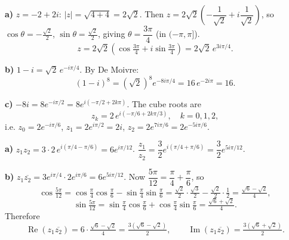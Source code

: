 \documentclass[11pt]{article}
\begin{document}
\begin{corrige}
\textbf{a)} $z = -2 + 2i$: $|z| = \sqrt{4+4} = 2\sqrt{2}$. Then $z = 2\sqrt{2}\left(-\dfrac{1}{\sqrt{2}} + i\dfrac{1}{\sqrt{2}}\right)$, so $\cos\theta = -\frac{\sqrt2}{2}$, $\sin\theta = \frac{\sqrt2}{2}$, giving $\theta = \dfrac{3\pi}{4}$ (in $(-\pi,\pi]$).
\[ z = 2\sqrt{2}\left(\cos\tfrac{3\pi}{4} + i\sin\tfrac{3\pi}{4}\right) = 2\sqrt{2}\,e^{3i\pi/4}. \]

\textbf{b)} $1 - i = \sqrt{2}\,e^{-i\pi/4}$. By De Moivre:
\[ (1-i)^8 = (\sqrt{2})^8 e^{-8i\pi/4} = 16\,e^{-2i\pi} = 16. \]

\textbf{c)} $-8i = 8e^{-i\pi/2} = 8e^{i( -\pi/2 + 2k\pi)}$. The cube roots are
\[ z_k = 2\,e^{i(-\pi/6 + 2k\pi/3)}, \quad k = 0, 1, 2, \]
i.e. $z_0 = 2e^{-i\pi/6}$, $z_1 = 2e^{i\pi/2} = 2i$, $z_2 = 2e^{7i\pi/6} = 2e^{-5i\pi/6}$.
\end{corrige}

\begin{corrige}
\textbf{a)} $z_1 z_2 = 3 \cdot 2 \, e^{i(\pi/4 - \pi/6)} = 6e^{i\pi/12}$. \quad $\dfrac{z_1}{z_2} = \dfrac{3}{2}e^{i(\pi/4 + \pi/6)} = \dfrac{3}{2}e^{5i\pi/12}$.

\textbf{b)} $z_1\overline{z_2} = 3e^{i\pi/4}\cdot 2e^{i\pi/6} = 6e^{5i\pi/12}$. Now $\dfrac{5\pi}{12} = \dfrac{\pi}{4} + \dfrac{\pi}{6}$, so
\[ \cos\tfrac{5\pi}{12} = \cos\tfrac{\pi}{4}\cos\tfrac{\pi}{6} - \sin\tfrac{\pi}{4}\sin\tfrac{\pi}{6} = \tfrac{\sqrt2}{2}\cdot\tfrac{\sqrt3}{2} - \tfrac{\sqrt2}{2}\cdot\tfrac12 = \tfrac{\sqrt6 - \sqrt2}{4}, \]
\[ \sin\tfrac{5\pi}{12} = \sin\tfrac{\pi}{4}\cos\tfrac{\pi}{6} + \cos\tfrac{\pi}{4}\sin\tfrac{\pi}{6} = \tfrac{\sqrt6 + \sqrt2}{4}. \]
Therefore
\[ \operatorname{Re}(z_1\overline{z_2}) = 6\cdot\tfrac{\sqrt6-\sqrt2}{4} = \tfrac{3(\sqrt6-\sqrt2)}{2}, \qquad \operatorname{Im}(z_1\overline{z_2}) = \tfrac{3(\sqrt6+\sqrt2)}{2}. \]
\end{corrige}
\end{document}
